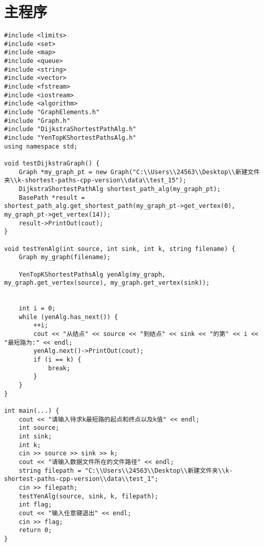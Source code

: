 \appendix


\chapter{主程序}\label{ch:主程序}
\begin{lstlisting}[label={lst:lstlisting}]
#include <limits>
#include <set>
#include <map>
#include <queue>
#include <string>
#include <vector>
#include <fstream>
#include <iostream>
#include <algorithm>
#include "GraphElements.h"
#include "Graph.h"
#include "DijkstraShortestPathAlg.h"
#include "YenTopKShortestPathsAlg.h"
using namespace std;

void testDijkstraGraph() {
    Graph *my_graph_pt = new Graph("C:\\Users\\24563\\Desktop\\新建文件夹\\k-shortest-paths-cpp-version\\data\\test_15");
    DijkstraShortestPathAlg shortest_path_alg(my_graph_pt);
    BasePath *result = shortest_path_alg.get_shortest_path(my_graph_pt->get_vertex(0), my_graph_pt->get_vertex(14));
    result->PrintOut(cout);
}

void testYenAlg(int source, int sink, int k, string filename) {
    Graph my_graph(filename);

    YenTopKShortestPathsAlg yenAlg(my_graph, my_graph.get_vertex(source), my_graph.get_vertex(sink));


    int i = 0;
    while (yenAlg.has_next()) {
        ++i;
        cout << "从结点" << source << "到结点" << sink << "的第" << i << "最短路为:" << endl;
        yenAlg.next()->PrintOut(cout);
        if (i == k) {
            break;
        }
    }
}

int main(...) {
    cout << "请输入待求k最短路的起点和终点以及k值" << endl;
    int source;
    int sink;
    int k;
    cin >> source >> sink >> k;
    cout << "请输入数据文件所在的文件路径" << endl;
    string filepath = "C:\\Users\\24563\\Desktop\\新建文件夹\\k-shortest-paths-cpp-version\\data\\test_1";
    cin >> filepath;
    testYenAlg(source, sink, k, filepath);
    int flag;
    cout << "输入任意键退出" << endl;
    cin >> flag;
    return 0;
}


\end{lstlisting}


